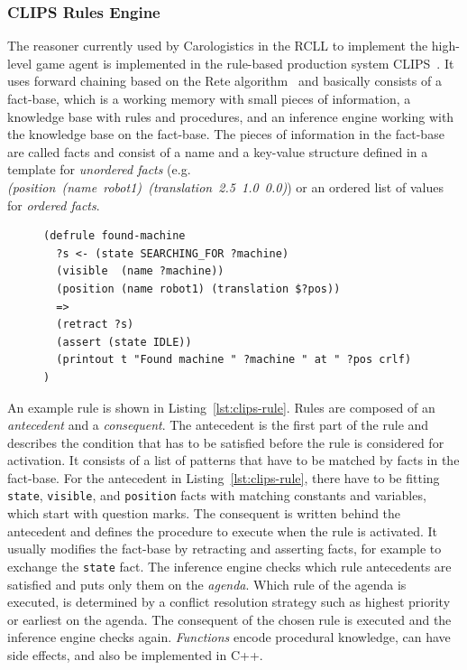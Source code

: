 \documentclass[a4paper,11pt]{article}
\newcommand{\reflst}[1]{Listing~\ref{#1}}
\begin{document}
\subsubsection{CLIPS Rules Engine} The reasoner currently used by
Carologistics in the RCLL to implement the high-level game agent is
implemented in the rule-based production system
CLIPS~\cite{CLIPS-RM}. It uses forward chaining based on the Rete
algorithm~\cite{Rete} and basically consists of a fact-base, which is
a working memory with small pieces of information, a knowledge base
with rules and procedures, and an inference engine working with the
knowledge base on the fact-base. The pieces of information in the
fact-base are called facts and consist of a name and a key-value
structure defined in a template for \emph{unordered facts}
(e.g. \textit{(position~(name~robot1)~(translation~2.5~1.0~0.0)}) or
an ordered list of values for \emph{ordered facts}.
\begin{figure}
\begin{lstlisting}[showlines,style=ReallySmallCLIPS, caption={CLIPS
    rule to change a robots state when the object it searched for is visible.},
  label=lst:clips-rule,
  emph={skill, args, state, target, res},
  emphstyle=\bfseries\color{green!80!black},
  emph={[2]\?skill, \$\?args, wait-for-lock, \?target, use,
  WAIT-FOR-LOCK, SKILL-EXECUTION, running},
  emphstyle={[2]\bfseries\color{blue!80!black}},
  morekeywords={retract, assert, modify, skill-call, skill-to-execute,
  wait-for-lock}]
(defrule found-machine
  ?s <- (state SEARCHING_FOR ?machine)
  (visible  (name ?machine))
  (position (name robot1) (translation $?pos))
  =>  
  (retract ?s) 
  (assert (state IDLE))
  (printout t "Found machine " ?machine " at " ?pos crlf)
)
\end{lstlisting} %
\end{figure}
An example rule is shown in \reflst{lst:clips-rule}. Rules are
composed of an \emph{antecedent} and a \emph{consequent}. The
antecedent is the first part of the rule and describes the condition
that has to be satisfied before the rule is considered for activation.
It consists of a list of patterns that have to be matched by facts in
the fact-base. For the antecedent in \reflst{lst:clips-rule}, there
have to be fitting \texttt{state}, \texttt{visible}, and
\texttt{position} facts with matching constants and variables, which
start with question marks. The consequent is written behind the
antecedent and defines the procedure to execute when the rule is
activated. It usually modifies the fact-base by retracting and
asserting facts, for example to exchange the \texttt{state} fact.  The
inference engine checks which rule antecedents are satisfied and puts
only them on the \emph{agenda}.  Which rule of the agenda is executed,
is determined by a conflict resolution strategy such as highest
priority or earliest on the agenda.  The consequent of the chosen rule
is executed and the inference engine checks again. \emph{Functions}
encode procedural knowledge, can have side effects, and also be
implemented in C++.
\end{document}
